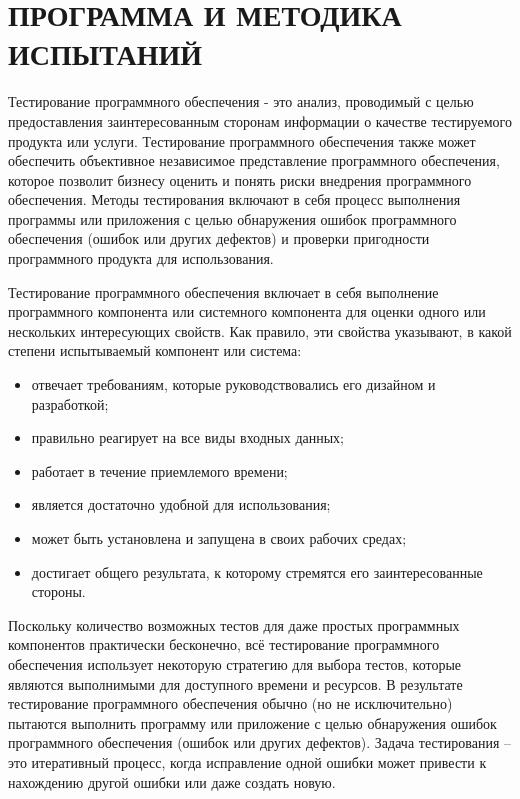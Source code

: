 \section{ПРОГРАММА И МЕТОДИКА ИСПЫТАНИЙ}
\label{sec:testing}


Тестирование программного обеспечения - это анализ, проводимый с целью предоставления заинтересованным сторонам информации о качестве тестируемого продукта или услуги. Тестирование программного обеспечения также может обеспечить объективное независимое представление программного обеспечения, которое позволит бизнесу оценить и понять риски внедрения программного обеспечения. Методы тестирования включают в себя процесс выполнения программы или приложения с целью обнаружения ошибок программного обеспечения (ошибок или других дефектов) и проверки пригодности программного продукта для использования.

Тестирование программного обеспечения включает в себя выполнение программного компонента или системного компонента для оценки одного или нескольких интересующих свойств. Как правило, эти свойства указывают, в какой степени испытываемый компонент или система:

\begin{itemize}
\item{отвечает требованиям, которые руководствовались его дизайном и разработкой;}
\item{правильно реагирует на все виды входных данных;}
\item{работает в течение приемлемого времени;}
\item{является достаточно удобной для использования;}
\item{может быть установлена и запущена в своих рабочих средах;}
\item{достигает общего результата, к которому стремятся его заинтересованные стороны.}
\end{itemize}


Поскольку количество возможных тестов для даже простых программных компонентов практически бесконечно, всё тестирование программного обеспечения использует некоторую стратегию для выбора тестов, которые являются выполнимыми для доступного времени и ресурсов. В результате тестирование программного обеспечения обычно (но не исключительно) пытаются выполнить программу или приложение с целью обнаружения ошибок программного обеспечения (ошибок или других дефектов). Задача тестирования --  это итеративный процесс, когда исправление  одной ошибки может привести к нахождению другой ошибки или даже создать новую.

